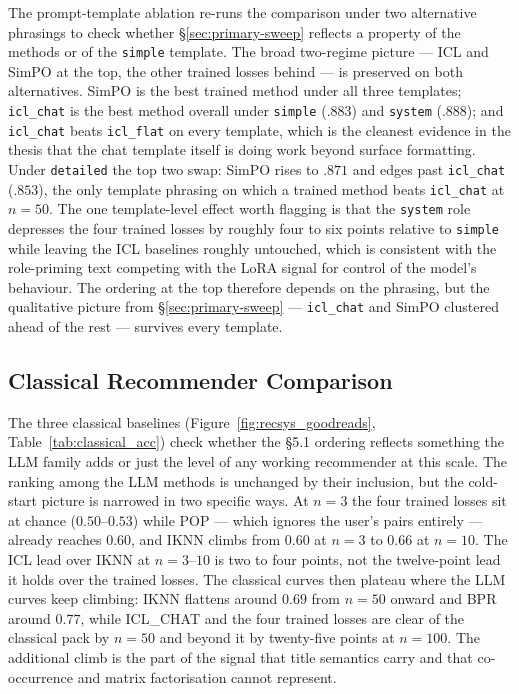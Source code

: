 The prompt-template ablation re-runs the comparison under two alternative
phrasings to check whether \S\ref{sec:primary-sweep} reflects a property
of the methods or of the \texttt{simple} template. The broad two-regime
picture --- ICL and SimPO at the top, the other trained losses behind ---
is preserved on both alternatives. SimPO is the best trained method under
all three templates; \texttt{icl\_chat} is the best method overall under
\texttt{simple} ($.883$) and \texttt{system} ($.888$); and
\texttt{icl\_chat} beats \texttt{icl\_flat} on every template, which is
the cleanest evidence in the thesis that the chat template itself is
doing work beyond surface formatting. Under \texttt{detailed} the top
two swap: SimPO rises to $.871$ and edges past \texttt{icl\_chat}
($.853$), the only template phrasing on which a trained method beats
\texttt{icl\_chat} at $n = 50$. The one template-level effect worth
flagging is that the \texttt{system} role depresses the four trained
losses by roughly four to six points relative to \texttt{simple} while
leaving the ICL baselines roughly untouched, which is consistent with
the role-priming text competing with the LoRA signal for control of the
model's behaviour. The ordering at the top therefore depends on the
phrasing, but the qualitative picture from \S\ref{sec:primary-sweep} ---
\texttt{icl\_chat} and SimPO clustered ahead of the rest --- survives
every template.

\subsection{Classical Recommender Comparison}
\label{sec:results:classical}

The three classical baselines (Figure~\ref{fig:recsys_goodreads},
Table~\ref{tab:classical_acc}) check whether the \S5.1 ordering reflects
something the LLM family adds or just the level of any working
recommender at this scale. The ranking among the LLM methods is unchanged
by their inclusion, but the cold-start picture is narrowed in two specific
ways. At $n = 3$ the four trained losses sit at chance ($0.50$--$0.53$)
while POP --- which ignores the user's pairs entirely --- already reaches
$0.60$, and IKNN climbs from $0.60$ at $n = 3$ to $0.66$ at $n = 10$. The
ICL lead over IKNN at $n = 3$--$10$ is two to four points, not the
twelve-point lead it holds over the trained losses. The classical curves
then plateau where the LLM curves keep climbing: IKNN flattens around
$0.69$ from $n = 50$ onward and BPR around $0.77$, while ICL\_CHAT and the
four trained losses are clear of the classical pack by $n = 50$ and beyond
it by twenty-five points at $n = 100$. The additional climb is the part of
the signal that title semantics carry and that co-occurrence and matrix
factorisation cannot represent.

